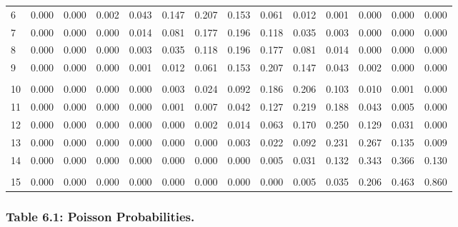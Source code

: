 \documentclass[
]{article}
\begin{document}
\begin{longtable}[t]{lrrrrrrrrrrrrr}
\hspace{1em}6 & 0.000 & 0.000 & 0.002 & 0.043 & 0.147 & 0.207 & 0.153 & 0.061 & 0.012 & 0.001 & 0.000 & 0.000 & 0.000\\
\hspace{1em}7 & 0.000 & 0.000 & 0.000 & 0.014 & 0.081 & 0.177 & 0.196 & 0.118 & 0.035 & 0.003 & 0.000 & 0.000 & 0.000\\
\hspace{1em}8 & 0.000 & 0.000 & 0.000 & 0.003 & 0.035 & 0.118 & 0.196 & 0.177 & 0.081 & 0.014 & 0.000 & 0.000 & 0.000\\
\hspace{1em}9 & 0.000 & 0.000 & 0.000 & 0.001 & 0.012 & 0.061 & 0.153 & 0.207 & 0.147 & 0.043 & 0.002 & 0.000 & 0.000\\
\addlinespace[-.7em]
\multicolumn{14}{l}{ }\\
\hspace{1em}10 & 0.000 & 0.000 & 0.000 & 0.000 & 0.003 & 0.024 & 0.092 & 0.186 & 0.206 & 0.103 & 0.010 & 0.001 & 0.000\\
\hspace{1em}11 & 0.000 & 0.000 & 0.000 & 0.000 & 0.001 & 0.007 & 0.042 & 0.127 & 0.219 & 0.188 & 0.043 & 0.005 & 0.000\\
\hspace{1em}12 & 0.000 & 0.000 & 0.000 & 0.000 & 0.000 & 0.002 & 0.014 & 0.063 & 0.170 & 0.250 & 0.129 & 0.031 & 0.000\\
\hspace{1em}13 & 0.000 & 0.000 & 0.000 & 0.000 & 0.000 & 0.000 & 0.003 & 0.022 & 0.092 & 0.231 & 0.267 & 0.135 & 0.009\\
\hspace{1em}14 & 0.000 & 0.000 & 0.000 & 0.000 & 0.000 & 0.000 & 0.000 & 0.005 & 0.031 & 0.132 & 0.343 & 0.366 & 0.130\\
\addlinespace[-.7em]
\multicolumn{14}{l}{ }\\
\hspace{1em}15 & 0.000 & 0.000 & 0.000 & 0.000 & 0.000 & 0.000 & 0.000 & 0.000 & 0.005 & 0.035 & 0.206 & 0.463 & 0.860\\
\bottomrule
\end{longtable}

\newpage

\subsubsection{Table 6.1: Poisson
Probabilities.}\label{table-6.1-poisson-probabilities.}
\end{document}
